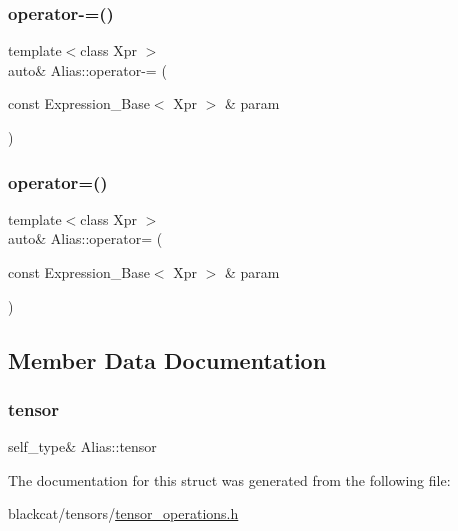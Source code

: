 \mbox{\label{structAlias_a005fd967ffd4094b6598da0280fa3fed}} 
\subsubsection{\texorpdfstring{operator-\/=()}{operator-=()}}
{\footnotesize\ttfamily template$<$class Xpr $>$ \\
auto\& Alias\+::operator-\/= (\begin{DoxyParamCaption}\item[{const Expression\+\_\+\+Base$<$ Xpr $>$ \&}]{param }\end{DoxyParamCaption})\hspace{0.3cm}{\ttfamily [inline]}}

\mbox{\label{structAlias_a18a1108238e76db0d138ecb26d57aa80}} 
\subsubsection{\texorpdfstring{operator=()}{operator=()}}
{\footnotesize\ttfamily template$<$class Xpr $>$ \\
auto\& Alias\+::operator= (\begin{DoxyParamCaption}\item[{const Expression\+\_\+\+Base$<$ Xpr $>$ \&}]{param }\end{DoxyParamCaption})\hspace{0.3cm}{\ttfamily [inline]}}



\subsection{Member Data Documentation}
\mbox{\label{structAlias_a17791174eae7fd8077e650ed61c668dc}} 
\subsubsection{\texorpdfstring{tensor}{tensor}}
{\footnotesize\ttfamily self\+\_\+type\& Alias\+::tensor}



The documentation for this struct was generated from the following file\+:\begin{DoxyCompactItemize}
\item 
blackcat/tensors/\hyperlink{tensor__operations_8h}{tensor\+\_\+operations.\+h}\end{DoxyCompactItemize}
